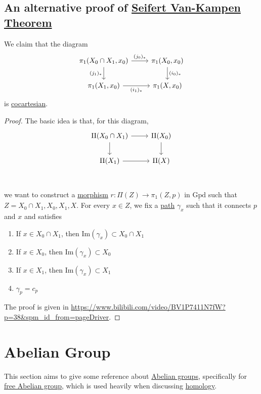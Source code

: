 \subsection{An alternative proof of \hyperref[thm:Seifert-Van-Kampen-Theorem]{Seifert Van-Kampen Theorem}}\label{pf:an-alternative-proof-of-Seifert-Van-Kampen-thm}
\begin{theorem}
	We claim that the diagram
	\[
		\begin{tikzcd}
			{\pi_1(X_0\cap X_1, x_0)} & {\pi_1(X_0, x_0)} \\
			{\pi_1(X_1, x_0)} & {\pi_1(X, x_0)}
			\arrow["{(j_0)_\ast}", from=1-1, to=1-2]
			\arrow["{(i_0)_\ast}", from=1-2, to=2-2]
			\arrow["{(i_1)_\ast}"', from=2-1, to=2-2]
			\arrow["{(j_1)_\ast}"', from=1-1, to=2-1]
		\end{tikzcd}
	\]
	is \hyperref[def:cocartesian]{cocartesian}.
\end{theorem}
\begin{proof}
	The basic idea is that, for this diagram,
	\[\begin{tikzcd}
			{\Pi(X_0\cap X_1)} & {\Pi(X_0)} \\
			{\Pi(X_1)} & {\Pi(X)} \\
			\arrow[from=1-1, to=1-2]
			\arrow[from=1-2, to=2-2]
			\arrow[from=2-1, to=2-2]
			\arrow[from=1-1, to=2-1]
		\end{tikzcd}\]
	we want to construct a \hyperref[def:morphism]{morphism} \(r\colon \Pi (Z)\to \pi _1(Z, p)\) in \(\underline{\mathrm{Gpd}}\) such that
	\(Z = X_0 \cap X_1, X_0, X_1, X\). For every \(x\in Z\), we fix a \hyperref[def:path]{path} \(\gamma _{x} \) such that it connects \(p\) and \(x\) and satisfies
	\begin{enumerate}
		\item If \(x\in X_0 \cap X_1\), then \(\mathrm{Im} (\gamma _{x} )\subset X_0 \cap X_1\)
		\item If \(x\in X_0\), then \(\mathrm{Im} (\gamma _{x} )\subset X_0\)
		\item If \(x\in X_1\), then \(\mathrm{Im} (\gamma _{x} )\subset X_1\)
		\item \(\gamma _p = c_p\)
	\end{enumerate}

	The proof is given in \url{https://www.bilibili.com/video/BV1P7411N7fW?p=38&spm_id_from=pageDriver}.
\end{proof}

\section{Abelian Group}
This section aims to give some reference about \hyperref[def:Abelian-group]{Abelian groups}, specifically for \hyperref[def:free-Abelian-group]{free Abelian group}, which is used
heavily when discussing \hyperref[def:homology]{homology}.
